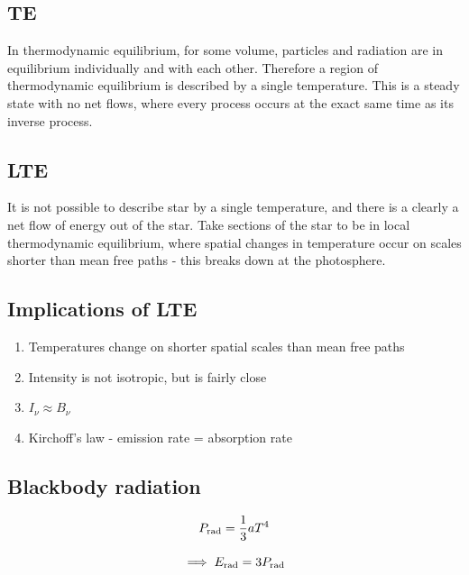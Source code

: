 \documentclass{article}
\begin{document}
\subsection{TE}

In thermodynamic equilibrium, for some volume, particles and radiation are in equilibrium individually and with each other. Therefore a region of thermodynamic equilibrium is described by a single temperature. This is a steady state with no net flows, where every process occurs at the exact same time as its inverse process.

\subsection{LTE}

It is not possible to describe star by a single temperature, and there is a clearly a net flow of energy out of the star. Take sections of the star to be in local thermodynamic equilibrium, where spatial changes in temperature occur on scales shorter than mean free paths - this breaks down at the photosphere.

\subsection{Implications of LTE}

\begin{enumerate}
    \item Temperatures change on shorter spatial scales than mean free paths

    \item Intensity is not isotropic, but is fairly close

    \item $I_\nu \approx B_\nu$

    \item Kirchoff's law - emission rate = absorption rate
\end{enumerate}

\subsection{Blackbody radiation}

\begin{equation}
    P_{\rm rad} = \frac{1}{3}aT^4
\end{equation}

\begin{equation}
    \implies E_{\rm rad} = 3P_{\rm rad}
\end{equation}
\end{document}
